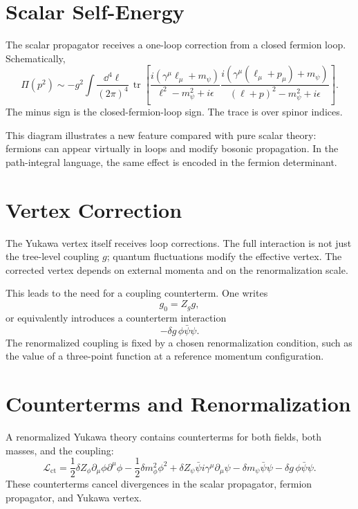 \section{Scalar Self-Energy}

The scalar propagator receives a one-loop correction from a closed fermion loop.
Schematically,
\[
    \Pi(p^2)
    \sim -g^2\int\frac{\dd^4\ell}{(2\pi)^4}\,
    \operatorname{tr}\left[
      \frac{i(\gamma^\mu\ell_\mu+m_\psi)}{\ell^2-m_\psi^2+i\epsilon}
      \frac{i(\gamma^\mu(\ell_\mu+p_\mu)+m_\psi)}{(\ell+p)^2-m_\psi^2+i\epsilon}
    \right].
\]
The minus sign is the closed-fermion-loop sign. The trace is over spinor
indices.

This diagram illustrates a new feature compared with pure scalar theory:
fermions can appear virtually in loops and modify bosonic propagation. In the
path-integral language, the same effect is encoded in the fermion determinant.

\section{Vertex Correction}

The Yukawa vertex itself receives loop corrections. The full interaction is not
just the tree-level coupling \(g\); quantum fluctuations modify the effective
vertex. The corrected vertex depends on external momenta and on the
renormalization scale.

This leads to the need for a coupling counterterm. One writes
\[
    g_0=Z_g g,
\]
or equivalently introduces a counterterm interaction
\[
    -\delta g\,\phi\bar\psi\psi.
\]
The renormalized coupling is fixed by a chosen renormalization condition, such
as the value of a three-point function at a reference momentum configuration.

\section{Counterterms and Renormalization}

A renormalized Yukawa theory contains counterterms for both fields, both masses,
and the coupling:
\[
    \mathcal{L}_{\mathrm{ct}}
    = \frac{1}{2}\delta Z_\phi\partial_\mu\phi\partial^\mu\phi
      -\frac{1}{2}\delta m_\phi^2\phi^2
      +\delta Z_\psi\bar\psi i\gamma^\mu\partial_\mu\psi
      -\delta m_\psi\bar\psi\psi
      -\delta g\,\phi\bar\psi\psi.
\]
These counterterms cancel divergences in the scalar propagator, fermion
propagator, and Yukawa vertex.

